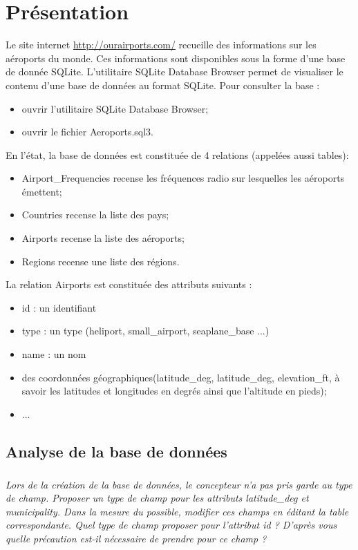 \documentclass[10pt]{article}
\begin{document}




\section*{Présentation}
Le site internet \url{http://ourairports.com/} recueille des informations sur les aéroports du monde. Ces informations sont disponibles sous la forme d'une base de donnée SQLite. 
L'utilitaire SQLite Database Browser permet de visualiser le contenu d'une base de données au format SQLite. Pour consulter la base :

\begin{itemize}%
\item ouvrir l'utilitaire SQLite Database Browser;
\item ouvrir le fichier \textsf{Aeroports.sql3}.
\end{itemize}

En l'état, la base de données est constituée de 4 relations (appelées aussi tables): 
\begin{itemize}
\item \textsf{Airport\_Frequencies} recense les fréquences radio sur lesquelles les aéroports émettent;
\item \textsf{Countries} recense la liste des pays;
\item \textsf{Airports} recense la liste des aéroports;
\item \textsf{Regions} recense une liste des régions.
\end{itemize}



La relation \textsf{Airports} est constituée des attributs suivants : 
\begin{itemize}
\item \textsf{id} : un identifiant
\item \textsf{type} : un type (heliport, small\_airport, seaplane\_base ...)
\item \textsf{name} : un nom
\item des coordonnées géographiques(\textsf{latitude\_deg}, \textsf{latitude\_deg}, \textsf{elevation\_ft}, à savoir les latitudes et longitudes en degrés ainsi que l'altitude en pieds);
\item ...
\end{itemize}

\subsection*{Analyse de la base de données}
\subparagraph{}
\textit{Lors de la création de la base de données, le concepteur n'a pas pris garde au type de champ. Proposer un type de champ pour les attributs \textsf{latitude\_deg} et \textsf{municipality}. Dans la mesure du possible, modifier ces champs en éditant la table correspondante. Quel type de champ proposer pour l'attribut \textsf{id} ? D'après vous quelle précaution est-il nécessaire de prendre pour ce champ ?}
\end{document}
